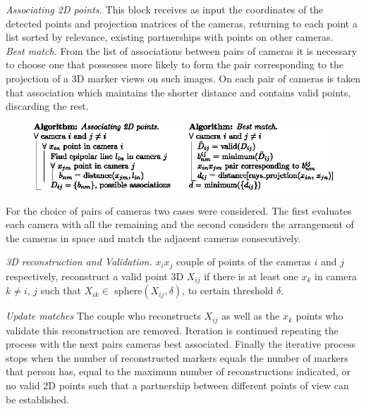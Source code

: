 \textit{Associating 2D points.}\label{seccion_asociar2D_uno}
%
This block receives as input the coordinates of the detected points and projection matrices of the cameras, returning to each point a list sorted by relevance, existing partnerships with points on other cameras. \\ 
\textit{\hspace*{0.5cm}Best match.}\label{MejorAsociacion}
%
From the list of associations between pairs of cameras it is necessary to choose one that possesses more likely to form the pair corresponding to the projection of a 3D marker views on such images.
%
On each pair of cameras is taken that association which maintains the shorter distance and contains valid points, discarding the rest. 
\vspace{-0.65cm}
\begin{figure}
    \begin{center}
       \includegraphics[scale=1.0]{./imagenes/Reconstruccion/Algoritmo_reconstruccion}       
    \end{center}
\end{figure}
\vspace{-1.0cm}

For the choice of pairs of cameras two cases were considered.
The first evaluates each camera with all the remaining and the second considers the arrangement of the cameras in space and match the adjacent cameras consecutively.

\textit{3D reconstruction and Validation.}\label{seccion_reconstruccion3D_validacion}
$x_i x_j$ couple of points of the cameras $i$ and $j$ respectively,  reconstruct a valid point 3D $X_{ij}$ if there is at least one $x_k$ in camera $k\not= i, \,j$ such that $X_{ik} \in $ sphere$(X_{ij}, \delta)$, to certain threshold $\delta$.

\textit{Update matches}\label{actualizar_asociaciones}
The couple who reconstructs $X_{ij}$ as well  as the $x_k$ points who validate this reconstruction are removed. 
Iteration is continued repeating the process with the next pairs cameras best associated.
Finally the iterative process stops when the number of reconstructed markers equals the number of markers that person has, equal to the maximum number of  reconstructions indicated, or no valid 2D points such that a partnership between different points of view can be established.